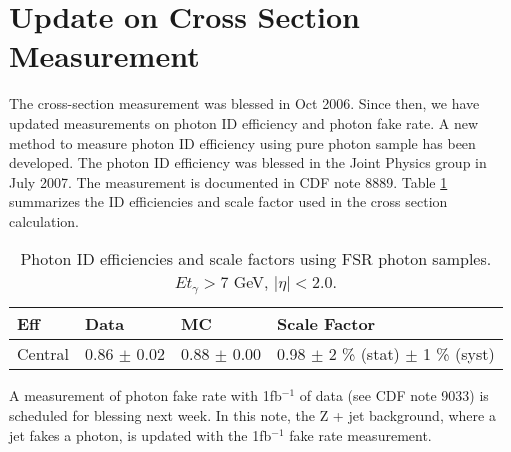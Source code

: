 \documentclass[12pt,twoside,letterpaper]{article}
\begin{document}
\section{Update on \Zg Cross Section Measurement}
The \Zg cross-section measurement was blessed in Oct 2006. Since then,
we have updated measurements on photon ID efficiency and photon fake rate. 
A new method to measure photon ID efficiency using pure photon sample
has been developed. The photon ID efficiency was blessed in the Joint
Physics group in July 2007. The measurement is documented in CDF note
8889\cite{PhotonIDnote}. Table \ref{table:PhotonSF} summarizes the ID
efficiencies and scale factor used in the cross section calculation. 

    \begin{table}[!hbtp]
    \begin{center}
    \begin{tabular}{|l|l|l|l|} 
 \hline 
                Eff        &  Data                  &              MC    &   Scale Factor                  \\  
 \hline                                                                                
                Central    &   0.86 $\pm$ 0.02      &    0.88 $\pm$ 0.00 &  0.98 $\pm$ 2 \%  (stat) $\pm$ 1 \%  (syst) \\  
 \hline                                                            
    \end{tabular}
     \caption{Photon ID efficiencies and scale factors using FSR photon samples. $Et_{\gamma} > 7$ GeV, $|\eta| < 2.0 $.  \label{table:PhotonSF}}
    \end{center}
    \end{table}

A measurement of photon fake rate with 1fb$^{-1}$ of data (see CDF
note 9033\cite{PhotonFakenote}) is scheduled for blessing next week. In this
note, the Z + jet background, where a jet fakes a photon, is updated
with the 1fb$^{-1}$ fake rate measurement. 
\end{document}
